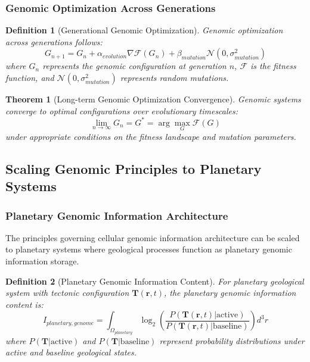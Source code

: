 \documentclass[12pt,a4paper]{article}
\newtheorem{theorem}{Theorem}
\newtheorem{definition}{Definition}
\begin{document}
\subsubsection{Genomic Optimization Across Generations}

\begin{definition}[Generational Genomic Optimization]
Genomic optimization across generations follows:
\begin{equation}
G_{n+1} = G_n + \alpha_{evolution} \nabla \mathcal{F}(G_n) + \beta_{mutation} \mathcal{N}(0, \sigma_{mutation}^2)
\end{equation}
where $G_n$ represents the genomic configuration at generation $n$, $\mathcal{F}$ is the fitness function, and $\mathcal{N}(0, \sigma_{mutation}^2)$ represents random mutations.
\end{definition}

\begin{theorem}[Long-term Genomic Optimization Convergence]
Genomic systems converge to optimal configurations over evolutionary timescales:
\begin{equation}
\lim_{n \to \infty} G_n = G^* = \arg\max_G \mathcal{F}(G)
\end{equation}
under appropriate conditions on the fitness landscape and mutation parameters.
\end{theorem}

\subsection{Scaling Genomic Principles to Planetary Systems}

\subsubsection{Planetary Genomic Information Architecture}

The principles governing cellular genomic information architecture can be scaled to planetary systems where geological processes function as planetary genomic information storage.

\begin{definition}[Planetary Genomic Information Content]
For planetary geological system with tectonic configuration $\mathbf{T}(\mathbf{r}, t)$, the planetary genomic information content is:
\begin{equation}
I_{planetary,genome} = \int_{\Omega_{planetary}} \log_2\left(\frac{P(\mathbf{T}(\mathbf{r}, t)|\text{active})}{P(\mathbf{T}(\mathbf{r}, t)|\text{baseline})}\right) d^3r
\end{equation}
where $P(\mathbf{T}|\text{active})$ and $P(\mathbf{T}|\text{baseline})$ represent probability distributions under active and baseline geological states.
\end{definition}
\end{document}
